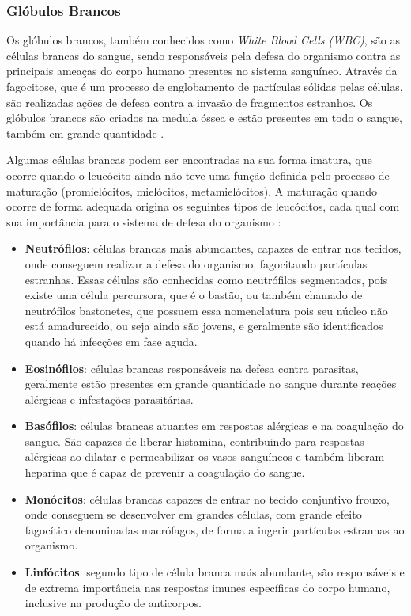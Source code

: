 \subsubsection{Glóbulos Brancos}
Os glóbulos brancos, também conhecidos como \emph{White Blood Cells (WBC)}, são as células brancas do sangue, sendo responsáveis pela defesa do organismo contra as principais ameaças do corpo humano presentes no sistema sanguíneo. Através da fagocitose, que é um processo de englobamento de partículas sólidas pelas células, são realizadas ações de defesa contra a invasão de fragmentos estranhos. Os glóbulos brancos são criados na medula óssea e estão presentes em todo o sangue, também em grande quantidade \cite{manualHematologia}.

Algumas células brancas podem ser encontradas na sua forma imatura, que ocorre quando o leucócito ainda não teve uma função definida pelo processo de maturação (promielócitos, mielócitos, metamielócitos). A maturação quando ocorre de forma adequada origina os seguintes tipos de leucócitos, cada qual com sua importância para o sistema de defesa do organismo \cite{manualHematologia}:

\begin{itemize}
	\item \textbf{Neutrófilos}: células brancas mais abundantes, capazes de entrar nos tecidos, onde conseguem realizar a defesa do organismo, fagocitando partículas estranhas. Essas células são conhecidas como neutrófilos segmentados, pois existe uma célula percursora, que é o bastão, ou também chamado de neutrófilos bastonetes, que possuem essa nomenclatura pois seu núcleo não está amadurecido, ou seja ainda são jovens, e geralmente são identificados quando há infecções em fase aguda. 
	\item \textbf{Eosinófilos}: células brancas responsáveis na defesa contra parasitas, geralmente estão presentes em grande quantidade no sangue durante reações alérgicas e infestações parasitárias.
	\item \textbf{Basófilos}: células brancas atuantes em respostas alérgicas e na coagulação do sangue. São capazes de liberar histamina, contribuindo para respostas alérgicas ao dilatar e permeabilizar os vasos sanguíneos e também liberam heparina que é capaz de prevenir a coagulação do sangue.
	\item \textbf{Monócitos}: células brancas capazes de entrar no tecido conjuntivo frouxo, onde conseguem se desenvolver em grandes células, com grande efeito fagocítico denominadas macrófagos, de forma a ingerir partículas estranhas ao organismo.
	\item \textbf{Linfócitos}: segundo tipo de célula branca mais abundante, são responsáveis e de extrema importância nas respostas imunes específicas do corpo humano, inclusive na produção de anticorpos.
\end{itemize}

